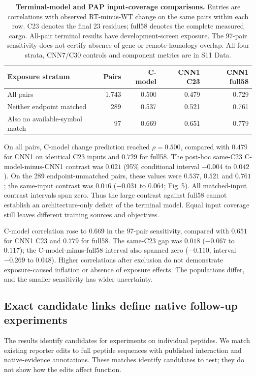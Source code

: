 \documentclass[11pt,a4paper]{article}
\begin{document}
\begin{table}[H]
\caption{\textbf{Terminal-model and PAP input-coverage comparisons.}
Entries are correlations with observed RT-minus-WT change on the same pairs
within each row. C23 denotes the final 23 residues; full58 denotes the complete
measured cargo. All-pair terminal results have development-screen exposure.
The 97-pair sensitivity does not certify absence of gene or remote-homology
overlap. All four strata, CNN7/C30 controls and component metrics are in S11 Data.}
\label{tab:terminal}
\centering\small
\begin{tabular}{lrrrr}
\toprule
Exposure stratum & Pairs & C-model & CNN1 C23 & CNN1 full58\\
\midrule
All pairs & 1,743 & 0.500 & 0.479 & 0.729\\
Neither endpoint matched & 289 & 0.537 & 0.521 & 0.761\\
Also no available-symbol match & 97 & 0.669 & 0.651 & 0.779\\
\bottomrule
\end{tabular}
\end{table}

On all pairs, C-model change prediction reached $\rho=0.500$, compared with
$0.479$ for CNN1 on identical C23 inputs and $0.729$ for full58. The
post-hoc same-C23 C-model-minus-CNN1 contrast was $0.021$ (95\% conditional
interval $-0.004$ to $0.042$). On the 289 endpoint-unmatched pairs, these
values were $0.537$, $0.521$ and $0.761$; the same-input contrast was $0.016$
($-0.031$ to $0.064$; Fig~5). All matched-input contrast
intervals span zero. Thus the large contrast against full58 cannot establish
an architecture-only deficit of the terminal model. Equal input coverage
still leaves different training sources and objectives.



C-model correlation rose to $0.669$ in the 97-pair sensitivity, compared with
$0.651$ for CNN1 C23 and $0.779$ for full58. The same-C23 gap was $0.018$
($-0.067$ to $0.117$); the C-model-minus-full58 interval also spanned zero
($-0.110$, interval $-0.269$ to $0.048$). Higher correlations after exclusion
do not demonstrate exposure-caused inflation or absence of exposure effects.
The populations differ, and the smaller sensitivity has wider uncertainty.

\subsection{Exact candidate links define native follow-up experiments}
The results identify candidates for experiments on individual peptides. We match existing reporter edits to full peptide sequences with published interaction and native-evidence annotations. These matches identify candidates to test; they do not show how the edits affect function.
\end{document}
